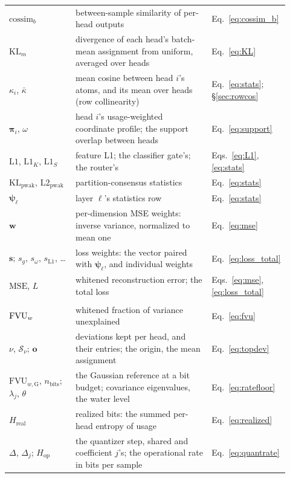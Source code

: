 \begin{longtable}{@{}>{\raggedright\arraybackslash}p{0.25\linewidth}%
>{\raggedright\arraybackslash}p{0.52\linewidth}%
>{\raggedright\arraybackslash}p{0.15\linewidth}@{}}
$\mathrm{cossim}_b$ & between-sample similarity of per-head outputs & Eq.~\eqref{eq:cossim_b} \\
$\mathrm{KL}_m$ & divergence of each head's batch-mean assignment from uniform, averaged over heads & Eq.~\eqref{eq:KL} \\
$\kappa_i$, $\bar\kappa$ & mean cosine between head $i$'s atoms, and its mean over heads (row collinearity) & Eq.~\eqref{eq:stats}; §\ref{sec:rowcos} \\
$\boldsymbol{\pi}_i$, $\omega$ & head $i$'s usage-weighted coordinate profile; the support overlap between heads & Eq.~\eqref{eq:support} \\
$\mathrm{L1}$, $\mathrm{L1}_K$, $\mathrm{L1}_S$ & feature L1; the classifier gate's; the router's & Eqs.~\eqref{eq:L1}, \eqref{eq:stats} \\
$\mathrm{KL}_{\mathrm{pwak}}$, $\mathrm{L2}_{\mathrm{pwak}}$ & partition-consensus statistics & Eq.~\eqref{eq:stats} \\
$\boldsymbol{\psi}_\ell$ & layer $\ell$'s statistics row & Eq.~\eqref{eq:stats} \\
$\mathbf{w}$ & per-dimension MSE weights: inverse variance, normalized to mean one & Eq.~\eqref{eq:mse} \\
$\mathbf{s}$; $s_g$, $s_\omega$, $s_{\mathrm{L1}}$, \dots & loss weights: the vector paired with $\boldsymbol{\psi}_\ell$, and individual weights & Eq.~\eqref{eq:loss_total} \\
$\mathrm{MSE}$, $L$ & whitened reconstruction error; the total loss & Eqs.~\eqref{eq:mse}, \eqref{eq:loss_total} \\
\addlinespace
\multicolumn{3}{@{}l}{\emph{Evaluation and baselines}} \\[2pt]
$\mathrm{FVU}_w$ & whitened fraction of variance unexplained & Eq.~\eqref{eq:fvu} \\
$\nu$, $\mathcal{S}_\nu$; $\mathbf{o}$ & deviations kept per head, and their entries; the origin, the mean assignment & Eq.~\eqref{eq:topdev} \\
$\mathrm{FVU}_{w,\mathrm{G}}$, $n_{\mathrm{bits}}$; $\lambda_j$, $\theta$ & the Gaussian reference at a bit budget; covariance eigenvalues, the water level & Eq.~\eqref{eq:ratefloor} \\
$H_{\mathrm{real}}$ & realized bits: the summed per-head entropy of usage & Eq.~\eqref{eq:realized} \\
$\Delta$, $\Delta_j$; $H_{\mathrm{op}}$ & the quantizer step, shared and coefficient $j$'s; the operational rate in bits per sample & Eq.~\eqref{eq:quantrate} \\

\end{longtable}
